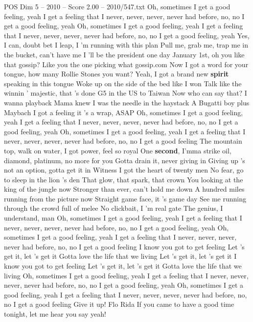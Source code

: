 \begin{textsample}{POS Dim 5 – 2010 – Score 2.00 – 2010/547.txt}  \label{ex:f5_pos_031}
Oh, sometimes I get a good feeling, yeah I get a feeling that I never, never, never, never had before, no, no I get a good feeling, yeah Oh, sometimes I get a good feeling, yeah I get a feeling that I never, never, never, never had before, no, no I get a good feeling, yeah Yes, I can, doubt bet I leap, I 'm running with this plan Pull me, grab me, trap me in the bucket, can't have me I 'll be the president one day January 1st, oh you like that gossip?
Like you the one picking what gossip.com Now I got a word for your tongue, how many Rollie Stones you want?
Yeah, I got a brand new \textbf{spirit} speaking in this tongue Woke up on the side of the bed like I won Talk like the winnin ' majestic, that 's done G5 in the US to Taiwan Now who can say that?
I wanna playback Mama knew I was the needle in the haystack A Bugatti boy plus Maybach I got a feeling it 's a wrap, ASAP Oh, sometimes I get a good feeling, yeah I get a feeling that I never, never, never, never had before, no, no I get a good feeling, yeah Oh, sometimes I get a good feeling, yeah I get a feeling that I never, never, never, never had before, no, no I get a good feeling The mountain top, walk on water, I got power, feel so royal One \textbf{second}, I'mma strike oil, diamond, platinum, no more for you Gotta drain it, never giving in Giving up 's not an option, gotta get it in Witness I got the heart of twenty men No fear, go to sleep in the lion 's den That glow, that spark, that crown You looking at the king of the jungle now Stronger than ever, can't hold me down A hundred miles running from the picture now Straight game face, it 's game day See me running through the crowd full of melee No clickbait, I 'm real gate The genius, I understand, man Oh, sometimes I get a good feeling, yeah I get a feeling that I never, never, never, never had before, no, no I get a good feeling, yeah Oh, sometimes I get a good feeling, yeah I get a feeling that I never, never, never, never had before, no, no I get a good feeling I know you got to get feeling Let 's get it, let 's get it Gotta love the life that we living Let 's get it, let 's get it I know you got to get feeling Let 's get it, let 's get it Gotta love the life that we living Oh, sometimes I get a good feeling, yeah I get a feeling that I never, never, never, never had before, no, no I get a good feeling, yeah Oh, sometimes I get a good feeling, yeah I get a feeling that I never, never, never, never had before, no, no I get a good feeling Give it up!
Flo Rida If you came to have a good time tonight, let me hear you say yeah!

\end{textsample}
